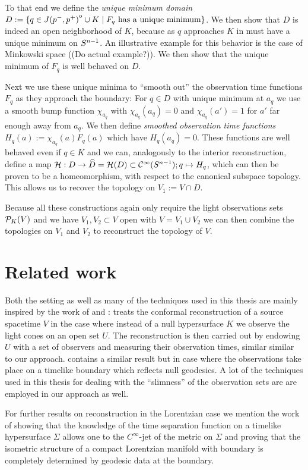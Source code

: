 To that end we define the \emph{unique minimum domain} $D:=\{q\in {\kern0ptJ(p^-,p^+)}^{\mathrm{o}}\cup K \mid F_q \text{ has a unique minimum}\}$. We then show that $D$ is indeed an open neighborhood of $K$, because as $q$ approaches $K$ in must have a unique minimum on ${S^{n-1}}$. An illustrative example for this behavior is the case of Minkowski space ((Do actual example?)). We then show that the unique minimum of $F_q$ is well behaved on $D$.

Next we use these unique minima to \enquote{smooth out} the observation time functions $F_q$ as they approach the boundary: For $q\in D$ with unique minimum at $a_q$ we use a smooth bump function $\chi_{a_q}$ with $\chi_{a_q}(a_q)=0$ and $\chi_{a_q}(a')=1$ for $a'$ far enough away from $a_q$. We then define \emph{smoothed observation time functions} $H_q(a):=\chi_{a_q}(a)F_q(a)$ which have $H_q(a_q)=0$. These functions are well behaved even if $q\in K$ and we can, analogously to the interior reconstruction, define a map ${\mathcal{H}}:D\to \widehat{D} = {\mathcal{H}}(D)\subset {\mathcal{C}}^\infty({S^{n-1}}); q\mapsto H_q$, which can then be proven to be a homeomorphism, with respect to the canonical subspace topology. This allows us to recover the topology on $V_1:= V\cap D$.

Because all these constructions again only require the light observations sets ${\mathcal{P}}_K(V)$ and we have $V_1, V_2\subset V$ open with $V=V_1\cup V_2$ we can then combine the topologies on $V_1$ and $V_2$ to reconstruct the topology of $V$.

\section{Related work}
Both the setting as well as many of the techniques used in this thesis are mainly inspired by the work of \citet{kurylev2017inverse} and \citet{hintzpaper}:
\cite{kurylev2017inverse} treats the conformal reconstruction of a source spacetime $V$ in the case where instead of a null hypersurface $K$ we observe the light cones on an open set $U$. The reconstruction is then carried out by endowing $U$ with a set of observers and measuring their observation times, similar similar to our approach. \cite{hintzpaper} contains a similar result but in case where the observations take place on a timelike boundary which reflects null geodesics. A lot of the techniques used in this thesis for dealing with the \enquote{slimness} of the observation sets are are employed in our approach as well.

For further results on reconstruction in the Lorentzian case we mention the work of \citet{lassas2016determination} showing that the knowledge of the time separation function on a timelike hypersurface $\Sigma$ allows one to the $C^\infty$-jet of the metric on $\Sigma$ and \citet{larsson2015broken} proving that the isometric structure of a compact Lorentzian manifold with boundary is completely determined by geodesic data at the boundary.

